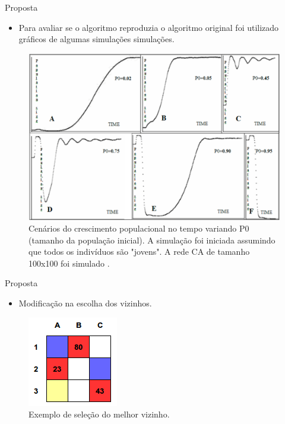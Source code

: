 \documentclass{beamer}
\begin{document}
\begin{frame}{Proposta}
	\begin{itemize}
		\item Para avaliar se o algoritmo reproduzia o algoritmo original
		foi utilizado gráficos de algumas simulações simulações.
	\end{itemize}
\begin{figure}[h!]
\centering
\includegraphics[width=.5\textwidth]{../artigo/imagens/crescimento-populacao-no-tempo}
\caption{Cenários do crescimento populacional no tempo variando P0 (tamanho 
da população inicial). A simulação foi iniciada assumindo que todos os 
indivíduos são "jovens". A rede CA de tamanho 100x100 foi simulado 
\cite{dzwinel:04}.}
\label{fig:crescimento-populacao-no-tempo}
\end{figure}
\end{frame}

\begin{frame}{Proposta}
	\begin{itemize}
		\item Modificação na escolha dos vizinhos.
	\end{itemize}
\begin{figure}[h!]
\centering
\includegraphics[width=.5\textwidth]{../artigo/imagens/escolha-melhor-vizinho}
\caption{Exemplo de seleção do melhor vizinho.}
\label{fig:busca-tabu}
\end{figure}
\end{frame}
\end{document}
